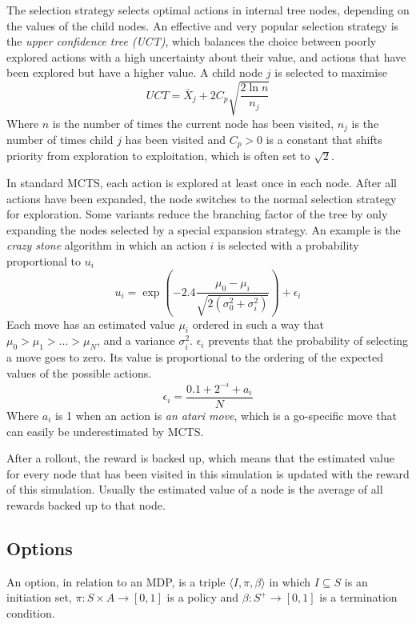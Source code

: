 The selection strategy selects optimal actions in internal tree nodes, depending
on the values of the child nodes. An effective and very popular selection
strategy is the \emph{upper confidence tree (UCT)}\cite{kocsis2006bandit}, which balances the choice 
between poorly explored actions with a high uncertainty about their value, and
actions that have been explored but have a higher value. A child node $j$ is
selected to maximise
$$UCT = \bar{X}_j + 2C_p \sqrt{\frac{2 \ln n}{n_j}}$$
Where $n$ is the number of times the current node has been visited, $n_j$ is the
number of times child $j$ has been visited and $C_p > 0$ is a constant that
shifts priority from exploration to exploitation, which is often set to $\sqrt{2}$.
	
In standard MCTS, each action is explored at least once in each node. After all
actions have been expanded, the node switches to the normal selection strategy
for exploration. Some variants reduce the branching factor of the tree by only
expanding the nodes selected by a special expansion strategy. An example is the
\emph{crazy stone} algorithm\cite{coulom2007efficient} in which an action $i$ is selected with a
probability proportional to $u_i$
$$u_i = \exp\left(-2.4\frac{\mu_0 - \mu_i}{\sqrt{2\left(\sigma_0^2 +
\sigma_i^2\right)}}\right) + \epsilon_i$$
Each move has an estimated value $\mu_i$ ordered in such a way that $\mu_0 >
\mu_1 > ... > \mu_N$, and a variance $\sigma_i^2$. $\epsilon_i$ prevents that
the probability of selecting a move goes to zero. Its value is proportional to
the ordering of the expected values of the possible actions.
$$\epsilon_i = \frac{0.1 + 2^{-i} + a_i}{N}$$
Where $a_i$ is 1 when an action is \emph{an atari move}, which is a go-specific
move that can easily be underestimated by MCTS.

After a rollout, the reward is backed up, which means that the estimated value
for every node that has been visited in this simulation is updated with the
reward of this simulation. Usually the estimated value of a node is the average
of all rewards backed up to that node.

\subsection{Options}
An option, in relation to an MDP, is a triple $\langle I, \pi, \beta\rangle$ in
which $I \subseteq S$ is an initiation set, $\pi: S \times A \rightarrow [0, 1]$
is a policy and $\beta: S^+ \rightarrow[0,1]$ is a termination
condition.\cite{sutton1999between}

